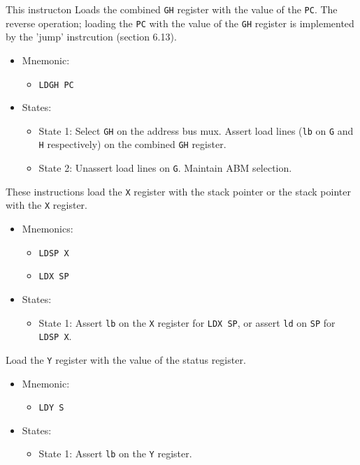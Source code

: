 \documentclass[a4paper,12pt]{article}
\newcommand{\Gr}{\texttt{G}}
\newcommand{\Hr}{\texttt{H}}
\newcommand{\Xr}{\texttt{X}}
\newcommand{\Yr}{\texttt{Y}}
\newcommand{\SP}{\texttt{SP}}
\newcommand{\PC}{\texttt{PC}}
\begin{document}
This instructon Loads the combined \Gr{}\Hr{} register with the value of the 
\PC{}. The reverse operation; loading the \PC{} with the value of the 
\Gr{}\Hr{} register is implemented by the 'jump' instrcution (section 6.13).
\par

\begin{itemize}
\item Mnemonic:
\begin{itemize}
	\item \texttt{LDGH PC}
\end{itemize}
\item States:
\begin{itemize}
	\item State 1: Select \Gr{}\Hr{} on the address bus mux. Assert load
	lines (\texttt{lb} on \Gr{} and \Hr{} respectively) on the combined 
	\Gr{}\Hr{} register.
	\item State 2: Unassert load lines on \Gr{}. Maintain ABM selection.
\end{itemize}
\end{itemize}

These instructions load the \Xr{} register with the stack pointer or the
stack pointer with the \Xr{} register.
\par

\begin{itemize}
\item Mnemonics:
\begin{itemize}
	\item \texttt{LDSP X}
	\item \texttt{LDX SP}
\end{itemize}
\item States: 
\begin{itemize}
	\item State 1: Assert \texttt{lb} on the \Xr{} register for 
	\texttt{LDX SP}, or assert \texttt{ld} on \SP{} for \texttt{LDSP X}.
\end{itemize}
\end{itemize}

Load the \Yr{} register with the value of the status register.
\par

\begin{itemize}
\item Mnemonic:
\begin{itemize}
	\item \texttt{LDY S}
\end{itemize}
\item States:
\begin{itemize}
	\item State 1: Assert \texttt{lb} on the \Yr{} register.
\end{itemize}
\end{itemize}
\end{document}
